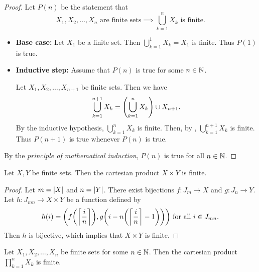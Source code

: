 \begin{proof}
    Let $P(n)$ be the statement that
    \[
    X_{1}, X_{2}, \dots, X_{n} \text{ are finite sets} \implies \bigcup_{k = 1}^{n} X_{k} \text{ is finite}.
    \]
    \begin{itemize}
        \item \textbf{Base case:} Let $X_{1}$ be a finite set. Then
        $\displaystyle \bigcup_{k = 1}^{1} X_{k}= X_{1}$ is finite. Thus $P(1)$ is true.
        \item \textbf{Inductive step:} Assume that $P(n)$ is true for some $n \in \N$.
        
        Let $X_{1}, X_{2}, \dots, X_{n + 1}$ be finite sets. Then we have
        \[
        \bigcup_{k = 1}^{n + 1} X_{k} = \paren*{\bigcup_{k = 1}^{n} X_{k}} \cup X_{n + 1}.
        \]
        By the inductive hypothesis, $\displaystyle \bigcup_{k = 1}^{n} X_{k}$ is finite. Then, by
        , $\displaystyle \bigcup_{k = 1}^{n + 1} X_{k}$ is finite.
        Thus $P(n + 1)$ is true whenever $P(n)$ is true.
    \end{itemize}
    By the \emph{principle of mathematical induction}, $P(n)$ is true for all $n \in \N$.
\end{proof}

\bigskip

\begin{lemma} \label{lem:ProductOfTwoFiniteSetsIsFinite}
    Let $X, Y$ be finite sets. Then the cartesian product $X \times Y$ is finite.
\end{lemma}

\begin{proof}
    Let $m = \abs*{X}$ and $n = \abs*{Y}$. There exist bijections $f: J_{m} \to X$ and $g: J_{n} \to Y$.
    Let $h: J_{mn} \to X \times Y$ be a function defined by
    \[
    h(i) = \paren*{f\paren*{\ceil*{\dfrac{i}{n}}}, g\paren*{i - n\paren*{\ceil*{\dfrac{i}{n}} - 1}}}
    \text{ for all } i \in J_{mn}.
    \]
    Then $h$ is bijective, which implies that $X \times Y$ is finite.
\end{proof}

\bigskip

\begin{theorem} \label{thm:ProductOfFiniteSetsIsFinite}
    Let $X_{1}, X_{2}, \dots, X_{n}$ be finite sets for some $n \in \N$. Then the cartesian product
    $\displaystyle \prod_{k = 1}^{n} X_{k}$ is finite.
\end{theorem}


